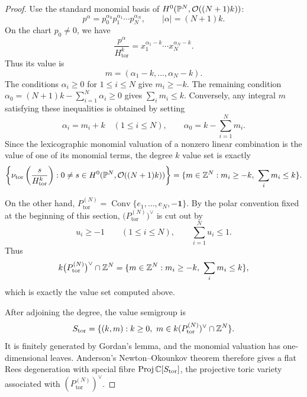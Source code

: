 \begin{proof}
Use the standard monomial basis of \(H^0(\mathbb{P}^N,\mathcal O((N+1)k))\):
\[
p^\alpha=p_0^{\alpha_0}p_1^{\alpha_1}\cdots p_N^{\alpha_N},
\qquad
|\alpha|=(N+1)k.
\]
On the chart \(p_0\ne0\), we have
\[
\frac{p^\alpha}{H_{\mathrm{tor}}^k}
=
x_1^{\alpha_1-k}\cdots x_N^{\alpha_N-k}.
\]
Thus its value is
\[
m=(\alpha_1-k,\ldots,\alpha_N-k).
\]
The conditions \(\alpha_i\ge0\) for \(1\le i\le N\) give \(m_i\ge-k\). The remaining condition
\(\alpha_0=(N+1)k-\sum_{i=1}^N\alpha_i\ge0\) gives \(\sum_i m_i\le k\). Conversely, any integral \(m\) satisfying these inequalities is obtained by setting
\[
\alpha_i=m_i+k\quad(1\le i\le N),
\qquad
\alpha_0=k-\sum_{i=1}^Nm_i.
\]
Since the lexicographic monomial valuation of a nonzero linear combination is the value of one of its monomial terms, the degree \(k\) value set is exactly
\[
\left\{
\nu_{\mathrm{tor}}\left(\frac{s}{H_{\mathrm{tor}}^k}\right):
0\ne s\in H^0(\mathbb{P}^N,\mathcal O((N+1)k))
\right\}
=
\{m\in\mathbb{Z}^N:m_i\ge-k,\ \sum_i m_i\le k\}.
\]

On the other hand, \(P_{\mathrm{tor}}^{(N)}=\operatorname{Conv}\{e_1,\ldots,e_N,-\mathbf 1\}\). By the polar convention fixed at the beginning of this section, \(\bigl(P_{\mathrm{tor}}^{(N)}\bigr)^\vee\) is cut out by
\[
u_i\ge -1\qquad(1\le i\le N),
\qquad
\sum_{i=1}^Nu_i\le1.
\]
Thus
\[
k\bigl(P_{\mathrm{tor}}^{(N)}\bigr)^\vee\cap\mathbb{Z}^N
=
\{m\in\mathbb{Z}^N:m_i\ge-k,\ \sum_i m_i\le k\},
\]
which is exactly the value set computed above.

After adjoining the degree, the value semigroup is
\[
S_{\mathrm{tor}}
=
\{(k,m):k\ge0,\ m\in k(P_{\mathrm{tor}}^{(N)})^\vee\cap\mathbb{Z}^N\}.
\]
It is finitely generated by Gordan's lemma, and the monomial valuation has one-dimensional leaves. Anderson's Newton--Okounkov theorem therefore gives a flat Rees degeneration with special fibre \(\operatorname{Proj}\mathbb{C}[S_{\mathrm{tor}}]\), the projective toric variety associated with \((P_{\mathrm{tor}}^{(N)})^\vee\).
\end{proof}

